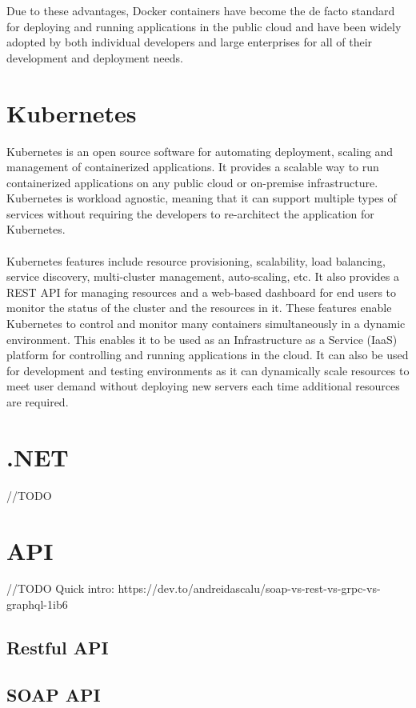 \documentclass[BIF,Master,nenglish]{twbook}%
\begin{document}
\noindent
Due to these advantages, Docker containers have become the de facto standard for deploying and running applications in the public cloud and have been widely adopted by both individual developers and large enterprises for all of their development and deployment needs.


\section{Kubernetes}
Kubernetes is an open source software for automating deployment, scaling and management of containerized applications. It provides a scalable way to run containerized applications on any public cloud or on-premise infrastructure. Kubernetes is workload agnostic, meaning that it can support multiple types of services without requiring the developers to re-architect the application for Kubernetes.\cite{luk2018}
\\
\\
Kubernetes features include resource provisioning, scalability, load balancing, service discovery, multi-cluster management, auto-scaling, etc. It also provides a REST API for managing resources and a web-based dashboard for end users to monitor the status of the cluster and the resources in it. These features enable Kubernetes to control and monitor many containers simultaneously in a dynamic environment. This enables it to be used as an Infrastructure as a Service (IaaS) platform for controlling and running applications in the cloud. It can also be used for development and testing environments as it can dynamically scale resources to meet user demand without deploying new servers each time additional resources are required.\cite{kubernetes}

\section{.NET}
//TODO

\section{API}
//TODO
Quick intro:
https://dev.to/andreidascalu/soap-vs-rest-vs-grpc-vs-graphql-1ib6
\subsection{Restful API}
\subsection{SOAP API}
\end{document}
